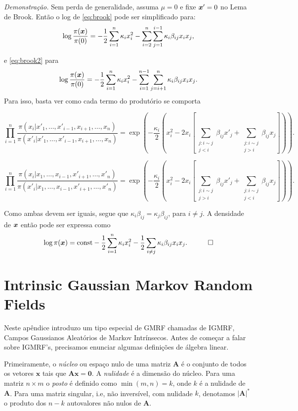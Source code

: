 \textit{Demonstração.} Sem perda de generalidade, assuma $\mu = 0$ e  fixe $\boldsymbol{x}' = 0$ no Lema de Brook. Então o log de \ref{eq:brook} pode ser simplificado para:
\begin{equation}
    \log \frac{\pi(\boldsymbol{x})}{\pi(0)} = -\frac{1}{2}\sum_{i=1}^{n}\kappa_ix_i^2 -\sum_{i=2}^n \sum_{j=1}^{i-1}\kappa_i\beta_{ij}x_ix_j,
\end{equation}

e \ref{eq:brook2} para
\begin{equation}
    \log \frac{\pi(\boldsymbol{x})}{\pi(0)} = -\frac{1}{2}\sum_{i=1}^{n}\kappa_ix_i^2 -\sum_{i=1}^{n-1} \sum_{j=i+1}^{n}\kappa_i\beta_{ij}x_ix_j.
\end{equation}
Para isso, basta ver como cada termo do produtório se comporta

\[\prod_{i=1}^n \frac{\pi(x_i|x'_1,\dots,x'_{i-1},x_{i+1}, \dots,x_{n})}{\pi(x'_i|x'_1,\dots,x'_{i-1},x_{i+1}, \dots,x_{n})} = \exp\left( -\frac{\kappa_i}{2}(x_i^2 -2x_i[\sum_{\substack{j:i\sim j \\ j < i}}\beta_{ij}x'_j + \sum_{\substack{j:i\sim j \\ j > i}}\beta_{ij}x_j])  \right).\]

\[\prod_{i=1}^n \frac{\pi(x_i|x_1,\dots,x_{i-1},x'_{i+1}, \dots,x'_{n})}{\pi(x'_i|x_1,\dots,x_{i-1},x'_{i+1}, \dots,x'_{n})} = \exp\left( -\frac{\kappa_i}{2}(x_i^2 -2x_i[\sum_{\substack{j:i\sim j \\ j > i}}\beta_{ij}x'_j + \sum_{\substack{j:i\sim j \\ j < i}}\beta_{ij}x_j])  \right).\]

Como ambas devem ser iguais, segue que $\kappa_i\beta_{ij} = \kappa_j\beta_{ij}$, para $i \neq j$. A densidade de $\boldsymbol{x}$ então pode ser expressa como
\[\log \pi(\boldsymbol{x}) = \text{const} - \frac{1}{2}\sum_{i = 1}^n \kappa_ix_i^2 - \frac{1}{2}\sum_{i \neq j}\kappa_i\beta_{ij}x_ix_j. \quad \qed\]





\chapter{Intrinsic Gaussian Markov Random Fields}

Neste apêndice introduzo um tipo especial de GMRF chamadas de IGMRF, Campos Gaussianos Aleatórios de Markov Intrínsecos. Antes de começar a falar sobre IGMRF's, precisamos enunciar algumas definições de álgebra linear.

Primeiramente, o \textit{núcleo} ou espaço nulo de uma matriz $\mathbf{A}$ é o conjunto de todos os vetores $\mathbf{x}$ tais que $\mathbf{Ax = 0}$. A \textit{nulidade} é a dimensão do núcleo. Para uma matriz $n \times m$ o \textit{posto} é definido como $\min (m,n) = k$, onde $k$ é a nulidade de $\mathbf{A}$. Para uma matriz singular, i.e, não inversível, com nulidade $k$, denotamos $|\mathbf{A}|^*$ o produto dos $n-k$ autovalores não nulos de $\mathbf{A}$. 

